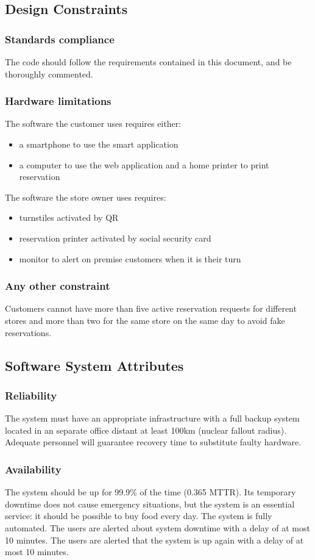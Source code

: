\subsection{Design Constraints}
\subsubsection{Standards compliance}
The code should follow the requirements contained in this document, and be thoroughly commented.
\subsubsection{Hardware limitations}
The software the customer uses requires either:
\begin{itemize}
	\item a smartphone to use the smart application
	\item a computer to use the web application and a home printer to print reservation
\end{itemize}
The software the store owner uses requires:
\begin{itemize}
	\item turnstiles activated by QR
	\item reservation printer activated by social security card
	\item monitor to alert on premise customers when it is their turn
\end{itemize}
\subsubsection{Any other constraint}
Customers cannot have more than five active reservation requests for different stores and more than two for the same store on the same day to avoid fake reservations.
\subsection{Software System Attributes}
\subsubsection{Reliability}
The system must have an appropriate infrastructure with a full backup system located in an separate office distant at least 100km (nuclear fallout radius). Adequate personnel will guarantee recovery time to substitute faulty hardware.
\subsubsection{Availability}
The system should be up for 99.9\% of the time (0.365 MTTR). Its temporary downtime does not cause emergency situations, but the system is an essential service: it should be possible to buy food every day. The system is fully automated. The users are alerted about system downtime with a delay of at most 10 minutes. The users are alerted that the system is up again with a delay of at most 10 minutes.
